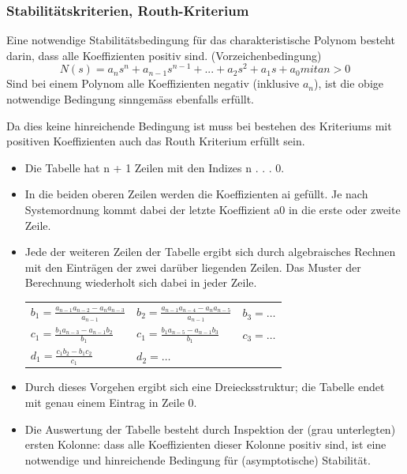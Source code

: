 \subsubsection{Stabilitätskriterien, Routh-Kriterium}

Eine notwendige Stabilitätsbedingung für das charakteristische Polynom besteht darin, dass alle Koeffizienten positiv sind. (Vorzeichenbedingung)
\begin{equation}
\boxed{N(s) = a_{n}s^n + a_{n-1}s^{n-1} + . . . + a_2s^2 + a_1s + a_0 mit an > 0}
\end{equation}
Sind bei einem Polynom alle Koeffizienten negativ (inklusive $a_n$), ist die obige
notwendige Bedingung sinngemäss ebenfalls erfüllt.



Da dies keine hinreichende Bedingung ist muss bei bestehen des Kriteriums mit positiven Koeffizienten auch das Routh Kriterium erfüllt sein.
\begin{itemize}
	\item Die Tabelle hat n + 1 Zeilen mit den Indizes n . . . 0.
	\item In die beiden oberen Zeilen werden die Koeffizienten ai gefüllt. Je nach Systemordnung
	kommt dabei der letzte Koeffizient a0 in die erste oder zweite Zeile.
	
	\item {Jede der weiteren Zeilen der Tabelle ergibt sich durch algebraisches Rechnen
	mit den Einträgen der zwei darüber liegenden Zeilen. Das Muster der Berechnung
	wiederholt sich dabei in jeder Zeile.\\
	\begin{tabularx}{\textwidth}{XXX}
	$b_1=\frac{a_{n-1}a_{n-2}-a_{n}a_{n-3}}{a_{n-1}}$
	& $b_2=\frac{a_{n-1}a_{n-4}-a_{n}a_{n-5}}{a_{n-1}}$
	& $b_3=\ldots$ \\
	$c_1=\frac{b_{1}a_{n-3}-a_{n-1}b_{2}}{b_{1}}$
	& $c_1=\frac{b_{1}a_{n-5}-a_{n-1}b_{3}}{b_{1}}$
	& $c_3=\ldots$ \\
	$d_1=\frac{c_{1}b_{2}-b_{1}c_{2}}{c_{1}}$
	& $d_2=\ldots$ & \\
	\end{tabularx}}
	\item Durch dieses Vorgehen ergibt sich eine Dreiecksstruktur; die Tabelle endet mit
	genau einem Eintrag in Zeile 0.
	\item Die Auswertung der Tabelle besteht durch Inspektion der (grau unterlegten)
	ersten Kolonne: dass alle Koeffizienten dieser Kolonne positiv sind, ist eine
	notwendige und hinreichende Bedingung für (asymptotische) Stabilität.
\end{itemize}
